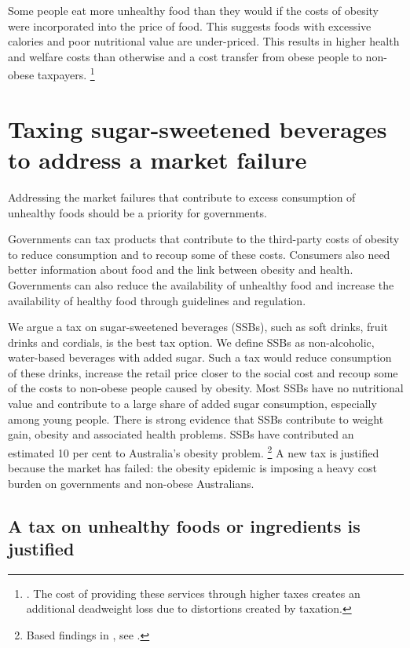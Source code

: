 \documentclass[embargoed]{grattan}
\begin{document}
Some people eat more unhealthy food than they would if the costs of obesity were incorporated into the price of food.
This suggests foods with excessive calories and poor nutritional value are under-priced.
This results in higher health and welfare costs than otherwise and a cost transfer from obese people to non-obese taxpayers.%
\footnote{\textcite{Bhattacharya2011Whopaysobesity}.
The cost of providing these services through higher taxes creates an additional deadweight loss due to distortions created by taxation.}

\chapter{Taxing sugar-sweetened beverages to address a market failure}\label{taxing-sugar-sweetened-beverages-to-address-a-market-failure}

Addressing the market failures that contribute to excess consumption of unhealthy foods should be a priority for governments.

Governments can tax products that contribute to the third-party costs of obesity to reduce consumption and to recoup some of these costs.
Consumers also need better information about food and the link between obesity and health.
Governments can also reduce the availability of unhealthy food and increase the availability of healthy food through guidelines and regulation.

We argue a tax on sugar-sweetened beverages (SSBs), such as soft drinks, fruit drinks and cordials, is the best tax option. We define SSBs as non-alcoholic, water-based beverages with added sugar. Such a tax would reduce consumption of these drinks, increase the retail price closer to the social cost and recoup some of the costs to non-obese people caused by obesity.
Most SSBs have no nutritional value and contribute to a large share of added sugar consumption, especially among young people.
There is strong evidence that SSBs contribute to weight gain, obesity and associated health problems.
SSBs have contributed an estimated 10 per cent to Australia's obesity problem.%
\footnote{Based findings in  \textcite{Woodward-Lopez2010whatextenthave}, see .} A new tax is justified because the market has failed: the obesity epidemic is imposing a heavy cost burden on governments and non-obese Australians.

\section{A tax on unhealthy foods or ingredients is justified}\label{a-tax-on-unhealthy-foods-or-ingredients-is-justified}
\end{document}
